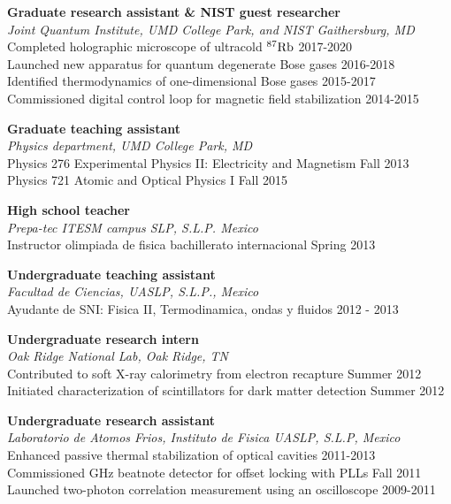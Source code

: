 \documentclass[margin]{res} %
\begin{document}
\begin{resume}
{\bf Graduate research assistant \& NIST guest researcher} \\
{\it Joint Quantum Institute, UMD College Park, and NIST Gaithersburg, MD}\\
{Completed holographic microscope of ultracold ${^{87} {\rm Rb}}$} \hfill 2017-2020 \\
{Launched new apparatus for quantum degenerate Bose gases} \hfill 2016-2018\\
{Identified thermodynamics of one-dimensional Bose gases} \hfill 2015-2017\\
{Commissioned digital control loop for magnetic field stabilization} \hfill 2014-2015

{\bf Graduate teaching assistant} \\
{\it Physics department, UMD College Park, MD}\\
{Physics 276 Experimental Physics II: Electricity and Magnetism} \hfill Fall 2013\\
{Physics 721 Atomic and Optical Physics I} \hfill Fall 2015

{\bf High school teacher} \\
{\it Prepa-tec ITESM campus SLP, S.L.P. Mexico}\\ 
{Instructor olimpiada de fisica bachillerato internacional} \hfill Spring 2013

{\bf Undergraduate teaching assistant} \\
{\it Facultad de Ciencias, UASLP, S.L.P., Mexico}\\
{Ayudante de SNI: Fisica II, Termodinamica, ondas y fluidos} \hfill 2012 - 2013

{\bf Undergraduate research intern} \\
{\it Oak Ridge National Lab, Oak Ridge, TN}\\
{Contributed to soft X-ray calorimetry from electron recapture} \hfill Summer 2012\\
{Initiated characterization of scintillators for dark matter detection} \hfill Summer 2012

{\bf Undergraduate research assistant} \\
{\it Laboratorio de Atomos Frios, Instituto de Fisica UASLP, S.L.P, Mexico}\\
{Enhanced passive thermal stabilization of optical cavities} \hfill 2011-2013\\
{Commissioned GHz beatnote detector for offset locking with PLLs} \hfill Fall 2011 \\
{Launched two-photon correlation measurement using an oscilloscope} \hfill 2009-2011


\end{resume}
\end{document}
